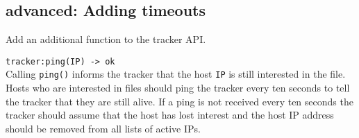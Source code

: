 \documentclass[12pt]{hitec}
\begin{document}
\subsection{advanced: Adding timeouts}

Add an additional function to the tracker API.

\begin{description}
\item \verb+tracker:ping(IP) -> ok+\\
Calling \verb+ping()+ informs the tracker that the host \verb+IP+ is
still interested in the file. Hosts who are interested in files should ping
the tracker every ten seconds to tell the tracker that they are still alive.
If a ping is not received every ten seconds the tracker should assume
that the host has lost interest and the host IP address should be removed from
all lists of active IPs.
\end{description}
 
\end{document}
